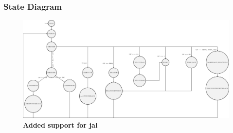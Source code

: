 \documentclass{article}
\begin{document}
\subsubsection*{State Diagram}
\begin{figure}[H]
    \begin{center}
        \includegraphics[scale=0.7]{MultiCycleImplementation_NewOnes2/TexFiles/SD2.pdf}
        \caption*{\textbf{Added support for jal}}
    \end{center}
\end{figure}
\end{document}
